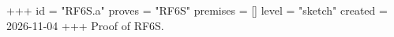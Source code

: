 +++
id = "RF6S.a"
proves = "RF6S"
premises = []
level = "sketch"
created = 2026-11-04
+++
Proof of RF6S.

